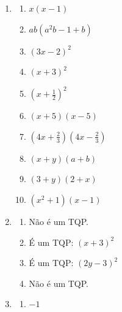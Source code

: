 \begin{description}
\begin{enumerate}[label=\textbf{\thesection.\thetempi.\thetempii}]
        \item \begin{multicols}{3}
            \begin{enumerate}[label=\alph*)]
                \item $x(x-1)$
                
                \item $ab(a^2b-1+b)$
                
                \item $(3x-2)^2$
                
                \item $(x+3)^2$
                
                \item $(x+\frac{1}{2})^2$
                
                \item $(x+5)(x-5)$
                
                \item $(4x+\frac{2}{3})(4x-\frac{2}{3})$
                
                \item $(x+y)(a+b)$
                
                \item $(3+y)(2+x)$
                
                \item $(x^2+1)(x-1)$
            \end{enumerate}
        \end{multicols}
        
        \item \begin{multicols}{2}
            \begin{enumerate}[label=\alph*)]
                \item Não é um TQP.
                
                \item É um TQP: $(x+3)^2$
                
                \item É um TQP: $(2y-3)^2$
                
                \item Não é um TQP.
            \end{enumerate}
        \end{multicols}
        
        \item \begin{multicols}{4}
            \begin{enumerate}[label=\alph*)]
                \item $-1$
                

\end{enumerate}
\end{multicols}
\end{enumerate}
\end{description}
